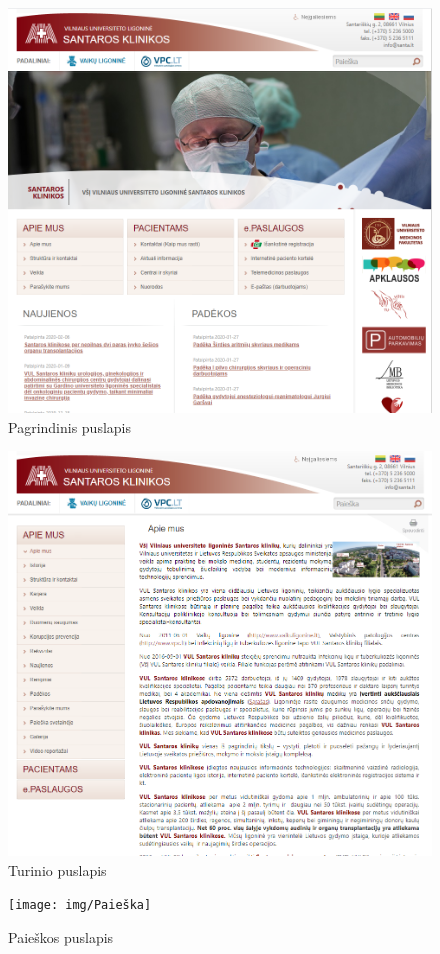 \documentclass{VUMIFPSkursinis}
\begin{document}
\begin{figure}[H]
    \centering
    \includegraphics[scale=0.65]{img/Pagrindinis}
    \caption{Pagrindinis puslapis}
    \label{img:PagrindinisPuslapis}
\end{figure}
\begin{figure}[H]
    \centering
    \includegraphics[scale=0.65]{img/Turinys}
    \caption{Turinio puslapis}
    \label{img:TurinysPuslapis}
\end{figure}
\begin{figure}[H]
    \centering
    \texttt{[image: img/Paieška]}
    \caption{Paieškos puslapis}
    \label{img:PaieškaPuslapis}
\end{figure}
\end{document}
